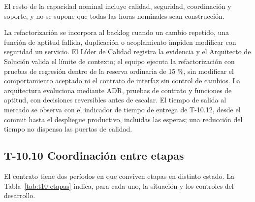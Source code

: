 \documentclass[11pt]{article}
\begin{document}
El resto de la capacidad nominal incluye calidad, seguridad, coordinación y soporte, y no se supone que todas las horas nominales sean construcción.

La refactorización se incorpora al backlog cuando un cambio repetido, una función de aptitud fallida, duplicación o acoplamiento impiden modificar con seguridad un servicio. El Líder de Calidad registra la evidencia y el Arquitecto de Solución valida el límite de contexto; el equipo ejecuta la refactorización con pruebas de regresión dentro de la reserva ordinaria de 15 \%, sin modificar el comportamiento aceptado ni el contrato de interfaz sin control de cambios. La arquitectura evoluciona mediante ADR, pruebas de contrato y funciones de aptitud, con decisiones reversibles antes de escalar. El tiempo de salida al mercado se observa con el indicador de tiempo de entrega de T-10.12, desde el commit hasta el despliegue productivo, incluidas las esperas; una reducción del tiempo no dispensa las puertas de calidad.

\subsection{T-10.10 Coordinación entre etapas}\label{t10-10}

El contrato tiene dos períodos en que conviven etapas en distinto estado. La Tabla~\mbox{\ref{tab:t10-etapas}} indica, para cada uno, la situación y los controles del desarrollo.
\end{document}
